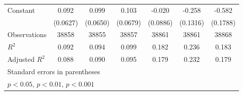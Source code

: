 {\begin{tabular}{l*{6}{c}}
\addlinespace
Constant            &       0.092         &       0.099         &       0.103         &      -0.020         &      -0.258\sym{*}  &      -0.582\sym{**} \\
                    &    (0.0627)         &    (0.0650)         &    (0.0679)         &    (0.0886)         &    (0.1316)         &    (0.1788)         \\
\midrule
Observations        &       38858         &       38855         &       38857         &       38861         &       38861         &       38868         \\
\(R^{2}\)           &       0.092         &       0.094         &       0.099         &       0.182         &       0.236         &       0.183         \\
Adjusted \(R^{2}\)  &       0.088         &       0.090         &       0.095         &       0.179         &       0.232         &       0.179         \\
\bottomrule
\multicolumn{7}{l}{\footnotesize Standard errors in parentheses}\\
\multicolumn{7}{l}{\footnotesize \sym{*} \(p<0.05\), \sym{**} \(p<0.01\), \sym{***} \(p<0.001\)}\\
\end{tabular}
}
